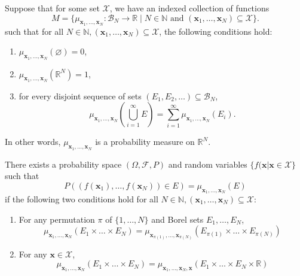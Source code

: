 \begin{theorem}\label{thm:kol-ext}
    Suppose that for some set $\mathcal{X}$, we have an indexed collection of functions
    \begin{equation*}
        M = \{ \mu_{\mathbf{x}_1, \dots, \mathbf{x}_N} : \mathcal{B}_{N} \to \mathbb{R} \;|\; N \in \mathbb{N} \text{ and } (\mathbf{x}_1, \dots, \mathbf{x}_N) \subseteq \mathcal{X}\}.
    \end{equation*}
    such that for all $N \in \mathbb{N}, (\mathbf{x}_1, \dots, \mathbf{x}_N) \subseteq \mathcal{X}$,
    the following conditions hold:
    \begin{enumerate}
        \item $\mu_{\mathbf{x}_1, \dots, \mathbf{x}_N}( \varnothing) = 0$,

        \item $\mu_{\mathbf{x}_1, \dots, \mathbf{x}_N}(\mathbb{R}^{N}) = 1$,
        \item for every disjoint sequence of sets $(E_1, E_2, \dots) \subseteq \mathcal{B}_N$,
            \begin{equation*}
                \mu_{\mathbf{x}_1, \dots, \mathbf{x}_N}\left(\bigcup_{i = 1}^{\infty}
                E\right) = \sum_{i = 1}^{\infty}\mu_{\mathbf{x}_1, \dots, \mathbf{x}_N}(E_i).
            \end{equation*}
    \end{enumerate}
    In other words, $\mu_{\mathbf{x}_1, \dots, \mathbf{x}_N}$ is a probability measure on $\mathbb{R}^{N}$.

    There exists a probability space $(\Omega, \mathcal{F}, P)$ and random variables $\{ f(\mathbf{x} | \mathbf{x} \in \mathcal{X} \}$ such that
    \begin{equation*}
        P((f(\mathbf{x}_1), \dots, f(\mathbf{x}_N)) \in E) = \mu_{\mathbf{x}_1, \dots, \mathbf{x}_N}(E)
    \end{equation*}
    if the following two conditions hold for all $N \in \mathbb{N}, (\mathbf{x}_1, \dots, \mathbf{x}_N) \subseteq \mathcal{X}$:
    \begin{enumerate}
        \item For any permutation $\pi$ of $\{ 1, \dots, N \}$ and Borel sets $E_1, \dots, E_N$,
            \begin{equation*}
                \mu_{\mathbf{x}_1, \dots, \mathbf{x}_N}(E_1 \times \dots \times E_N)
                =\mu_{\mathbf{x}_{\pi(1)}, \dots, \mathbf{x}_{\pi(N)}}\left(E_{\pi(1)} \times \dots \times E_{\pi(N)}\right)
            \end{equation*}
        \item For any $\mathbf{x} \in \mathcal{X}$,
            \begin{equation*}
                \mu_{\mathbf{x}_1, \dots, \mathbf{x}_N}(E_1 \times \dots \times E_N)
                =
                \mu_{\mathbf{x}_1, \dots, \mathbf{x}_N, \mathbf{x}}(E_1 \times \dots \times E_N \times \mathbb{R})
            \end{equation*}
    \end{enumerate}
\end{theorem}

